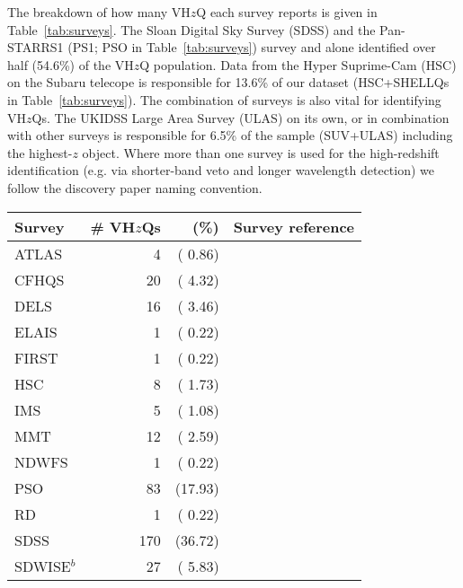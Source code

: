 \documentclass[usenatbib]{mnras}
\begin{document}
The breakdown of how many VH$z$Q each survey reports is given in Table~\ref{tab:surveys}. The Sloan Digital Sky Survey (SDSS) and the Pan-STARRS1 (PS1; PSO in Table~\ref{tab:surveys}) survey and alone identified over half (54.6\%) of the VH$z$Q population. Data from the Hyper Suprime-Cam (HSC) on the Subaru telecope is responsible for 13.6\% of our dataset (HSC+SHELLQs in Table~\ref{tab:surveys}). The combination of surveys is also vital for identifying VH$z$Qs. The UKIDSS Large Area Survey (ULAS) on its own, or in combination with other surveys is responsible for 6.5\% of the sample (SUV+ULAS) including the highest-$z$ object. Where more than one survey is used for the high-redshift identification (e.g. via shorter-band veto and longer wavelength detection) we follow the discovery paper naming convention.


\begin{table}
\begin{tabular}{l r r l}
\hline  \hline
Survey              & \# VH$z$Qs & (\%) & Survey reference  \\
\hline  
  ATLAS             &     4    &   ( 0.86)    &  \citet{Shanks2015} \\
  CFHQS            &   20    &   ( 4.32)    &  \citet{Willott2007} \\
  DELS               &   16    &   ( 3.46)    &  \citet{Dey2018} \\
  ELAIS              &     1    &   ( 0.22)    &  \citet{Vaisanen2000} \\
  FIRST              &     1    &   ( 0.22)    &  \citet{Becker1995} \\
  HSC                 &    8    &   ( 1.73)    & \citet{Miyazaki2018} \\
  IMS                 &     5    &   ( 1.08)     &  \citet{Kim2015} \\
  MMT               &   12    &   ( 2.59)     &  \citet{McGreer2013} \\
  NDWFS           &     1    &   ( 0.22)    &  \citet{JD1999} \\
  PSO                 &   83   &   (17.93)   &   \citet{Kaiser2002, Kaiser2010} \\
  RD                   &     1   &   ( 0.22)    &  \citet{Mahabal2005} \\
  SDSS                &  170  &    (36.72)    & \citet{EDR} \\
 SDWISE$^{b}$    &   27    &  ( 5.83)    &   \citet{WangF2016} \\

\end{tabular}
\end{table}
\end{document}
